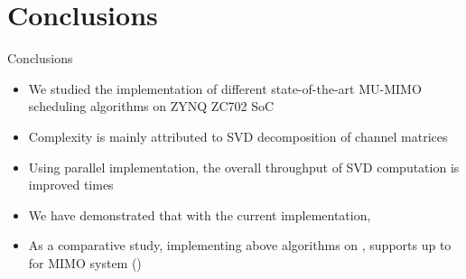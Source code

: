 \documentclass[11pt]{beamer}
\begin{document}
\section{Conclusions}

\begin{frame}{Conclusions}
\begin{itemize}
\item We studied the implementation of different state-of-the-art MU-MIMO scheduling algorithms on ZYNQ ZC702 SoC
\item Complexity is mainly attributed to SVD decomposition of channel matrices
\item Using parallel implementation, the overall throughput of SVD computation is improved  times 
\item We have demonstrated that with the current implementation, 
\item As a comparative study, implementing above algorithms on , supports up to  for  MIMO system ()
\end{itemize}
\end{frame}
\end{document}
